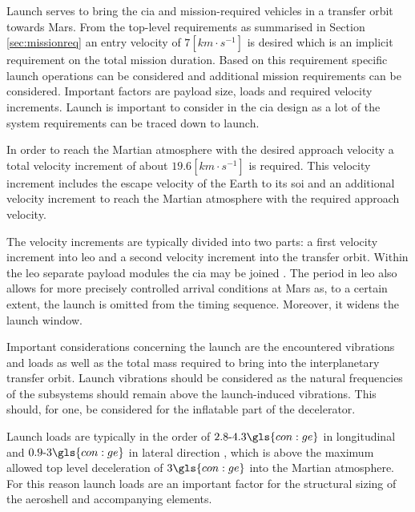 Launch serves to bring the \gls{cia} and mission-required vehicles in a transfer orbit towards Mars. From the top-level requirements as summarised in Section \ref{sec:missionreq} an entry velocity of $7 [km\cdot s^{-1}]$ is desired which is an implicit requirement on the total mission duration.
Based on this requirement specific launch operations can be considered and additional mission requirements can be considered. Important factors are payload size, loads and required velocity increments. Launch is important to consider in the \gls{cia} design as a lot of the system requirements can be traced down to launch.

In order to reach the Martian atmosphere with the desired approach velocity a total velocity increment of about $19.6 [km\cdot s^{-1}]$ is required. This velocity increment includes the escape velocity of the Earth to its \gls{soi} and an additional velocity increment to reach the Martian atmosphere with the required approach velocity.

The velocity increments are typically divided into two parts: a first velocity increment into \gls{leo} and a second velocity increment into the transfer orbit. Within the \gls{leo} separate payload modules the \gls{cia} may be joined \cite{George2009}. The period in \gls{leo} also allows for more precisely controlled arrival conditions at Mars as, to a certain extent, the launch is omitted from the timing sequence. Moreover, it widens the launch window.


Important considerations concerning the launch are the encountered vibrations and loads as well as the total mass required to bring into the interplanetary transfer orbit. Launch vibrations should be considered as the natural frequencies of the subsystems should remain above the launch-induced vibrations. This should, for one, be considered for the inflatable part of the decelerator.

Launch loads are typically in the order of $2.8\mbox{-}4.3 \gls{con:ge}$ in longitudinal and $0.9\mbox{-}3 \gls{con:ge}$ in lateral direction \cite{Wertz2011}, which is above the maximum allowed top level deceleration of $3\gls{con:ge}$ into the Martian atmosphere. For this reason launch loads are an important factor for the structural sizing of the aeroshell and accompanying elements. 

